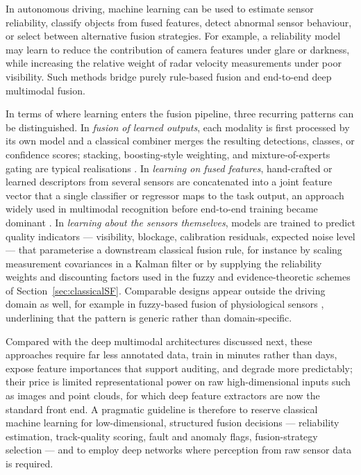 \documentclass{ieeeaccess}
\newcommand{\addednew}[1]{\textcolor{RevisionOlive}{#1}}
\begin{document}
In autonomous driving, machine learning can be used to estimate sensor reliability, classify objects from fused features, detect abnormal sensor behaviour, or select between alternative fusion strategies. For example, a reliability model may learn to reduce the contribution of camera features under glare or darkness, while increasing the relative weight of radar velocity measurements under poor visibility. Such methods bridge purely rule-based fusion and end-to-end deep multimodal fusion.

\addednew{In terms of where learning enters the fusion pipeline, three recurring patterns can be distinguished. In \emph{fusion of learned outputs}, each modality is first processed by its own model and a classical combiner merges the resulting detections, classes, or confidence scores; stacking, boosting-style weighting, and mixture-of-experts gating are typical realisations \cite{breiman2001_rf,khaleghi_multisensor_2013}. In \emph{learning on fused features}, hand-crafted or learned descriptors from several sensors are concatenated into a joint feature vector that a single classifier or regressor maps to the task output, an approach widely used in multimodal recognition before end-to-end training became dominant \cite{atrey_multimodal_2010,gao_survey_2020}. In \emph{learning about the sensors themselves}, models are trained to predict quality indicators --- visibility, blockage, calibration residuals, expected noise level --- that parameterise a downstream classical fusion rule, for instance by scaling measurement covariances in a Kalman filter or by supplying the reliability weights and discounting factors used in the fuzzy and evidence-theoretic schemes of Section~\ref{sec:classicalSF}. Comparable designs appear outside the driving domain as well, for example in fuzzy-based fusion of physiological sensors \cite{testa_fuzzyfusion_2025}, underlining that the pattern is generic rather than domain-specific.}

\addednew{Compared with the deep multimodal architectures discussed next, these approaches require far less annotated data, train in minutes rather than days, expose feature importances that support auditing, and degrade more predictably; their price is limited representational power on raw high-dimensional inputs such as images and point clouds, for which deep feature extractors \cite{guo_deep_2019} are now the standard front end. A pragmatic guideline is therefore to reserve classical machine learning for low-dimensional, structured fusion decisions --- reliability estimation, track-quality scoring, fault and anomaly flags, fusion-strategy selection --- and to employ deep networks where perception from raw sensor data is required.}
\end{document}
